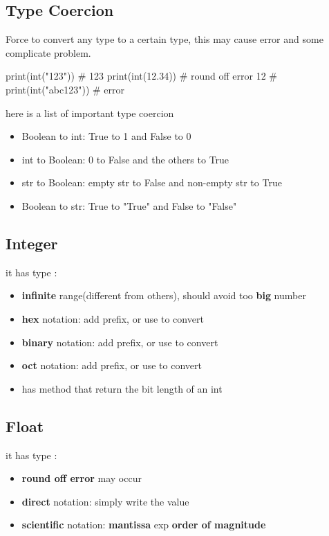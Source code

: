 \documentclass[10pt,a4paper,oneside]{article}
\begin{document}
\subsection{Type Coercion}
Force to convert any type to a certain type, this may cause error and some complicate problem.
\begin{python}
	print(int("123"))  # 123
	print(int(12.34))  # round off error 12
	# print(int("abc123"))  # error
\end{python}
here is a list of important type coercion
\begin{itemize}
	\item Boolean to int: True to 1 and False to 0
	\item int to Boolean: 0 to False and the others to True
	\item str to Boolean: empty str to False and non-empty str to True
	\item Boolean to str: True to "True" and False to "False"
\end{itemize}

\subsection{Integer}
it has type :
\begin{itemize}
	\item \textbf{infinite} range(different from others), should avoid too \textbf{big} number
	\item \textbf{hex} notation: add  prefix, or use  to convert
	\item \textbf{binary} notation: add  prefix, or use  to convert
	\item \textbf{oct} notation: add  prefix, or use  to convert
	\item has method  that return the bit length of an int
\end{itemize}

\subsection{Float}
it has type :
\begin{itemize}
	\item \textbf{round off error} may occur
	\item \textbf{direct} notation: simply write the value
	\item \textbf{scientific} notation: \textbf{mantissa} exp \textbf{order of magnitude}
\end{itemize}
\end{document}

